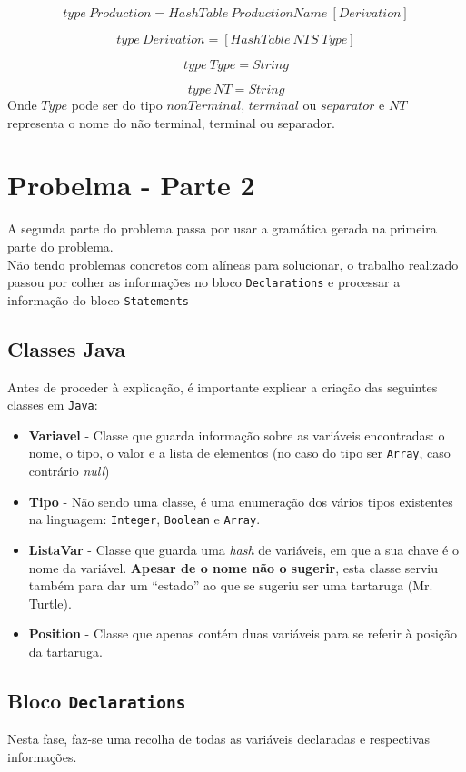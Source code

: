 \documentclass[11pt,a4paper]{article}
\begin{document}
$$type~Production = HashTable~ProductionName~[Derivation]$$

$$type~Derivation = [HashTable~NTS~Type]$$

$$type~Type = String$$

$$type~NT = String$$
Onde $Type$ pode ser do tipo $nonTerminal$, $terminal$ ou $separator$ e $NT$ representa o nome do não terminal, terminal ou separador.
\newpage
\section{Probelma - Parte 2}
A segunda parte do problema passa por usar a gramática gerada na primeira parte do problema.\\

Não tendo problemas concretos com alíneas para solucionar, o trabalho realizado passou por colher as informações no bloco \texttt{Declarations} e processar a informação do bloco 
\texttt{Statements}

\subsection{Classes Java}
Antes de proceder à explicação, é importante explicar a criação das seguintes classes em \texttt{Java}:
\begin{itemize}
 \item \textbf{Variavel} - Classe que guarda informação sobre as variáveis encontradas: o nome, o tipo, o valor e a lista de elementos (no caso do tipo ser \texttt{Array}, caso contrário 
\emph{null})
 \item \textbf{Tipo} - Não sendo uma classe, é uma enumeração dos vários tipos existentes na linguagem: \texttt{Integer}, \texttt{Boolean} e \texttt{Array}.
 \item \textbf{ListaVar} - Classe que guarda uma \emph{hash} de variáveis, em que a sua chave é o nome da variável. \textbf{Apesar de o nome não o sugerir}, esta classe serviu também para
dar um ``estado'' ao que se sugeriu ser uma tartaruga (Mr. Turtle).
 \item \textbf{Position} - Classe que apenas contém duas variáveis para se referir à posição da tartaruga.
\end{itemize}

\subsection{Bloco \texttt{Declarations}}
Nesta fase, faz-se uma recolha de todas as variáveis declaradas e respectivas informações.\\
\end{document}
